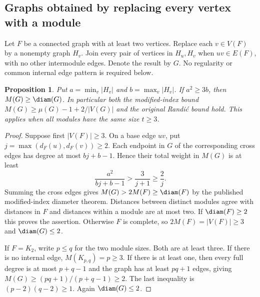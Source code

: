 \documentclass[11pt,a4paper]{article}
\newtheorem{proposition}[theorem]{Proposition}
\begin{document}
\subsection*{Graphs obtained by replacing every vertex with a module}
Let $F$ be a connected graph with at least two vertices. Replace each $v\in V(F)$ by a nonempty graph $H_v$. Join every pair of vertices in $H_u,H_v$ when $uv\in E(F)$, with no other intermodule edges. Denote the result by $G$. No regularity or common internal edge pattern is required below.
\begin{proposition}
Put $a=\min_v|H_v|$ and $b=\max_v|H_v|$. If $a^2\ge3b$, then $M(G)\ge\diam(G)$. In particular both the modified-index bound $M(G)\ge\mu(G)-1+2/|V(G)|$ and the original Randi\'c bound hold. This applies when all modules have the same size $t\ge3$.
\end{proposition}
\begin{proof}
Suppose first $|V(F)|\ge3$. On a base edge $uv$, put $j=\max(d_F(u),d_F(v))\ge2$. Each endpoint in $G$ of the corresponding cross edges has degree at most $bj+b-1$. Hence their total weight in $M(G)$ is at least
\[
 \frac{a^2}{bj+b-1}>\frac{3}{j+1}\ge\frac{2}{j}.
\]
Summing the cross edges gives $M(G)>2M(F)\ge\diam(F)$ by the published modified-index diameter theorem. Distances between distinct modules agree with distances in $F$ and distances within a module are at most two. If $\diam(F)\ge2$ this proves the assertion. Otherwise $F$ is complete, so $2M(F)=|V(F)|\ge3$ and $\diam(G)\le2$.

If $F=K_2$, write $p\le q$ for the two module sizes. Both are at least three. If there is no internal edge, $M(K_{p,q})=p\ge3$. If there is at least one, then every full degree is at most $p+q-1$ and the graph has at least $pq+1$ edges, giving $M(G)\ge(pq+1)/(p+q-1)\ge2$. The last inequality is $(p-2)(q-2)\ge1$. Again $\diam(G)\le2$.
\end{proof}
\end{document}
